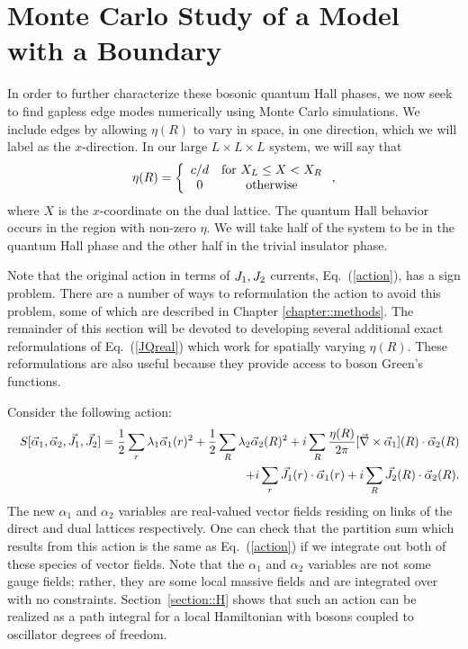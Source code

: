 \section{Monte Carlo Study of a Model with a Boundary}
\label{sec:reform}
In order to further characterize these bosonic quantum Hall phases, we now seek to find gapless edge modes numerically using Monte Carlo simulations.\cite{Senthil_Ashvin_thanks}  We include edges by allowing $\eta(R)$ to vary in space, in one direction, which we will label as the $x$-direction. In our large $L\times L\times L$ system, we will say that 
\begin{equation}
\eta(R)=\left\{\begin{array}{cc}
c/d & {\rm for}~ X_L \leq X < X_R \\
0 & {\rm otherwise}
\end{array}\right. ,
\label{etaspace}
\end{equation}
where $X$ is the $x$-coordinate on the dual lattice. The quantum Hall behavior occurs in the region with non-zero $\eta$. 
We will take half of the system to be in the quantum Hall phase and the other half in the trivial insulator phase.

Note that the original action in terms of $J_1, J_2$ currents, Eq.~(\ref{action}), has a sign problem.  There are a number of ways to reformulation the action to avoid this problem, some of which are described in Chapter \ref{chapter::methods}.   The remainder of this section will be devoted to developing several additional exact reformulations of Eq.~(\ref{JQreal}) which work for spatially varying $\eta(R)$.  These reformulations are also useful because they provide access to boson Green's functions.

Consider the following action:
\begin{eqnarray}
&&S[\vec{\alpha}_1,\vec{\alpha}_2,\vec{J}_1,\vec{J}_2]=\frac{1}{2}\sum_r \lambda_1 \vec{\alpha}_{1}(r)^2 + \frac{1}{2}\sum_R \lambda_2 \vec{\alpha}_{2}(R)^2  \nonumber
 +i\sum_R \frac{\eta(R)}{2\pi} [\vec{\nabla}\times\vec{\alpha}_{1}](R) \cdot \vec{\alpha}_{2}(R)\nonumber\\
&&~~~~~~~~ +i\sum_r \vec{J}_1(r)\cdot\vec{\alpha}_{1}(r)+i\sum_R \vec{J}_2(R)\cdot\vec{\alpha}_{2}(R).
\label{preal}
\end{eqnarray}
The new $\alpha_1$ and $\alpha_2$ variables are real-valued vector fields residing on links of the direct and dual lattices respectively. One can check that the partition sum which results from this action is the same as Eq.~(\ref{action}) if we integrate out both of these species of vector fields.  Note that the $\alpha_1$ and $\alpha_2$ variables are not some gauge fields; rather, they are some local massive fields and are integrated over with no constraints.  Section~\ref{section::H} shows that such an action can be realized as a path integral for a local Hamiltonian with bosons coupled to oscillator degrees of freedom. 

